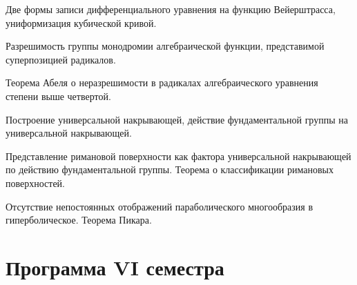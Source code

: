 \documentclass[a4paper]{article}
\begin{document}
\begin{nums}{-2}
\item Две формы записи дифференциального уравнения на функцию Вейерштрасса, униформизация кубической кривой.
\item Разрешимость группы монодромии алгебраической функции, представимой суперпозицией радикалов.
\item Теорема Абеля о неразрешимости в радикалах алгебраического уравнения степени выше четвертой.
\item Построение универсальной накрывающей, действие фундаментальной группы на универсальной накрывающей.
\item Представление римановой поверхности как фактора универсальной накрывающей по действию
      фундаментальной группы. Теорема о классификации римановых поверхностей.
\item Отсутствие непостоянных отображений параболического многообразия в гиперболическое. Теорема Пикара.
\end{nums}

\pagebreak

\section*{Программа VI семестра}
\end{document}
